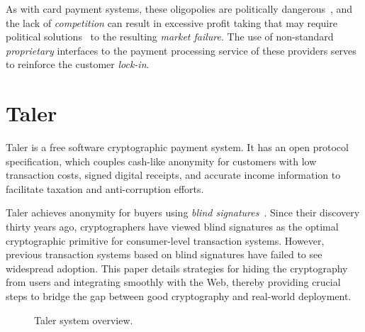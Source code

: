 \documentclass{llncs}
\begin{document}
As with card payment systems, these oligopolies are politically
dangerous~\cite{crinkey2011rundle}, and the lack of {\em competition}
can result in excessive profit taking that may require political
solutions~\cite{guardian2015cap} to the resulting {\em market
  failure}.  The use of non-standard {\em proprietary} interfaces to
the payment processing service of these providers serves to reinforce
the customer {\em lock-in}.


\section{Taler}

Taler is a free software cryptographic payment system. It has an open
protocol specification, which couples cash-like anonymity for customers
with low transaction costs, signed digital
receipts, and accurate income information to facilitate taxation and
anti-corruption efforts.

Taler achieves anonymity for buyers using {\em blind
signatures}~\cite{chaum1983blind}.  Since their discovery thirty years
ago, cryptographers have viewed blind signatures as the optimal
cryptographic primitive for consumer-level transaction systems.
However, previous transaction systems based on blind signatures have
failed to see widespread adoption.  This paper details strategies for
hiding the cryptography from users and integrating smoothly with the
Web, thereby providing crucial steps to bridge the gap between good
cryptography and real-world deployment.


\begin{figure}[t!]
\centering
{}
\caption{Taler system overview.}
\label{fig:system}
\end{figure}
\end{document}

